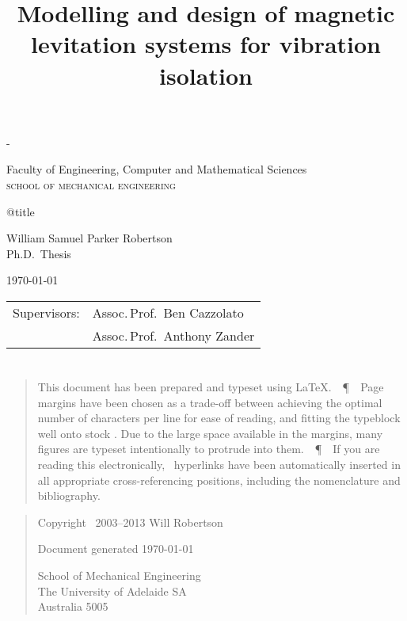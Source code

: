 \documentclass[11pt,a4paper]{memoir}
\title{
Modelling and design of magnetic levitation systems for vibration isolation
}
\begin{document}
\pagestyle{empty}
\label{titlepage}
\calccentering{\unitlength}
\begin{adjustwidth*}{\unitlength}{-\unitlength}
\setlength{\parindent}{0pt}

\begin{flushright}
\end{flushright}

\vfill

Faculty of Engineering,
Computer and Mathematical Sciences\\
\textsc{school of mechanical engineering}

\vfill

{\Large\raggedright\csname @title\endcsname}

\vspace{10mm}

William Samuel Parker Robertson\\
Ph.D.\ Thesis
\vspace{10mm}

\today

\vfill

\vfill

\begin{tabular}{@{}ll}
Supervisors:    & Assoc.\,Prof.\ Ben Cazzolato  \\
                & Assoc.\,Prof.\ Anthony Zander
\end{tabular}
\end{adjustwidth*}

\clearpage
\small

\def\PPP{\unskip~\,\textup\P~\,}

\section*{}

\begin{quote}
\nonfrenchspacing
\parfillskip=0pt
This document has been prepared and typeset using \LaTeX{}.
\PPP
Page margins have been chosen as a trade-off between achieving the optimal number of characters per line for ease of reading, and fitting the typeblock well onto  stock \cite{bringhurst-typestyle}.
Due to the large space available in the margins, many figures are typeset intentionally to protrude into them.
\PPP
If you are reading this electronically, \PDF\ hyperlinks have been automatically inserted in all appropriate cross-referencing positions, including the nomenclature and bibliography.
\end{quote}
\vfil
\begin{quote}
  \centering
  Copyright \textcopyright\ 2003--2013 Will Robertson

  \bigskip
  Document generated \today

  \bigskip
  School of Mechanical Engineering\\
  The University of Adelaide SA\\
  Australia 5005\\
\end{quote}
\end{document}
